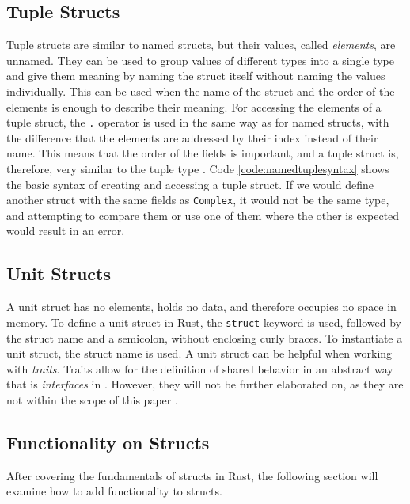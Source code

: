 \subsection{Tuple Structs}
Tuple structs are similar to named structs, but their values, called \textit{elements}, are unnamed.
They can be used to group values of different types into a single type and give them meaning by naming the struct itself without naming the values individually.
This can be used when the name of the struct and the order of the elements is enough to describe their meaning.
For accessing the elements of a tuple struct, the \texttt{.} operator is used in the same way as for named structs, with the difference that the elements are addressed by their index instead of their name.
This means that the order of the fields is important, and a tuple struct is, therefore, very similar to the tuple type \cite[Chapter~5.1]{rustbook} \cite[212-213]{Blandy_Jim2021-07-20}.
Code \ref{code:namedtuplesyntax} shows the basic syntax of creating and accessing a tuple struct.
If we would define another struct with the same fields as \texttt{Complex}, it would not be the same type, and attempting to compare them or use one of them where the other is expected would result in an error.


\subsection{Unit Structs}
A unit struct has no elements, holds no data, and therefore occupies no space in memory.
To define a unit struct in Rust, the \texttt{struct} keyword is used, followed by the struct name and a semicolon, without enclosing curly braces.
To instantiate a unit struct, the struct name is used.
A unit struct can be helpful when working with \textit{traits}.
Traits allow for the definition of shared behavior in an abstract way that is \textit{interfaces} in \Cpp.
However, they will not be further elaborated on, as they are not within the scope of this paper \cite[213]{Blandy_Jim2021-07-20} \cite[Chapter~10.2]{rustbook}.


\subsection{Functionality on Structs}
After covering the fundamentals of structs in Rust, the following section will examine how to add functionality to structs.


